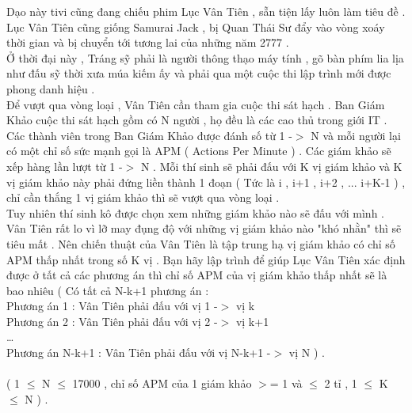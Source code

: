 Dạo này tivi cũng đang chiếu phim Lục Vân Tiên , sẵn tiện lấy luôn làm tiêu đề .   
\\   Lục Vân Tiên cũng giống Samurai Jack , bị Quan Thái Sư đẩy vào vòng xoáy thời gian và bị chuyển tới tương lai của những năm 2777 .   
\\   Ở thời đại này , Tráng sỹ phải là người thông thạo máy tính , gõ bàn phím lia lịa như đấu sỹ thời xưa múa kiếm ấy và phải qua một cuộc thi lập trình mới được phong danh hiệu .   
\\   Để vượt qua vòng loại , Vân Tiên cần tham gia cuộc thi sát hạch . Ban Giám Khảo cuộc thi sát hạch gồm có N người , họ đều là các cao thủ trong giới IT . Các thành viên trong Ban Giám Khảo được đánh số từ 1 -$>$ N và mỗi người lại có một chỉ số sức mạnh gọi là APM ( Actions Per Minute ) . Các giám khảo sẽ xếp hàng lần lượt từ 1 -$>$ N . Mỗi thí sinh sẽ phải đấu với K vị giám khảo và K vị giám khảo này phải đứng liền thành 1 đoạn ( Tức là i , i+1 , i+2 , ... i+K-1 ) , chỉ cần thắng 1 vị giám khảo thì sẽ vượt qua vòng loại .   
\\   Tuy nhiên thí sinh kô được chọn xem những giám khảo nào sẽ đấu với mình .   
\\   Vân Tiên rất lo vì lỡ may đụng độ với những vị giám khảo nào "khó nhằn" thì sẽ tiêu mất . Nên chiến thuật của Vân Tiên là tập trung hạ vị giám khảo có chỉ số APM thấp nhất trong số K vị . Bạn hãy lập trình để giúp Lục Vân Tiên xác định được ở tất cả các phương án thì chỉ số APM của vị giám khảo thấp nhất sẽ là bao nhiêu ( Có tất cả N-k+1 phương án :   
\\   Phương án 1 : Vân Tiên phải đấu với vị 1 -$>$ vị k   
\\   Phương án 2 : Vân Tiên phải đấu với vị 2 -$>$ vị k+1   
\\   …   
\\   Phương án N-k+1  : Vân Tiên phải đấu với vị N-k+1 -$>$ vị N ) .   
\\
\\   ( 1  $\le$  N  $\le$  17000 , chỉ số APM của 1 giám khảo $>$= 1 và  $\le$  2 tỉ , 1  $\le$  K  $\le$  N ) .